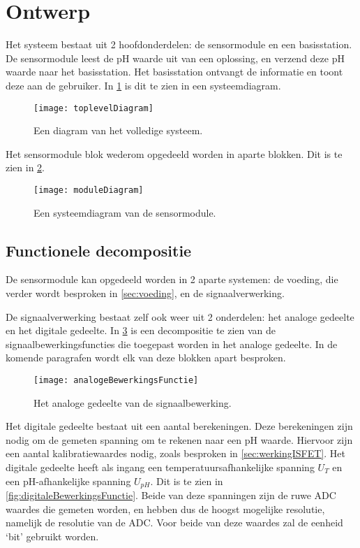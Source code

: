 \section{Ontwerp}\label{sec:ontwerp}
Het systeem bestaat uit 2 hoofdonderdelen: de sensormodule en een basisstation. De sensormodule leest de pH waarde uit van een oplossing, en verzend deze pH waarde naar het basisstation. Het basisstation ontvangt de informatie en toont deze aan de gebruiker.
In \cref{fig:functional} is dit te zien in een systeemdiagram.

\begin{figure}[ht]
    \centering
    \texttt{[image: toplevelDiagram]}
    \caption[short]{Een diagram van het volledige systeem.}
    \label{fig:functional}
\end{figure}

Het sensormodule blok wederom opgedeeld worden in aparte blokken. Dit is te zien in \cref{fig:moduleDiagram}.

\begin{figure}[ht]
    \centering
    \texttt{[image: moduleDiagram]}
    \caption{Een systeemdiagram van de sensormodule.} 
    \label{fig:moduleDiagram}
\end{figure}

\subsection{Functionele decompositie}
De sensormodule kan opgedeeld worden in 2 aparte systemen: de voeding, die verder wordt besproken in \cref{sec:voeding}, en de signaalverwerking.

De signaalverwerking bestaat zelf ook weer uit 2 onderdelen: het analoge gedeelte en het digitale gedeelte. In \cref{fig:analogeBewerkingsFunctie} is een decompositie te zien van de signaalbewerkingsfuncties die toegepast worden in het analoge gedeelte. In de komende paragrafen wordt elk van deze blokken apart besproken.

\begin{figure}[ht]
    \centering
    \texttt{[image: analogeBewerkingsFunctie]}
    \caption{Het analoge gedeelte van de signaalbewerking.} 
    \label{fig:analogeBewerkingsFunctie}
\end{figure}


Het digitale gedeelte bestaat uit een aantal berekeningen. Deze berekeningen zijn nodig om de gemeten spanning om te rekenen naar een pH waarde. Hiervoor zijn een aantal kalibratiewaardes nodig, zoals besproken in \cref{sec:werkingISFET}. Het digitale gedeelte heeft als ingang een temperatuursafhankelijke spanning $U_T$ en een pH-afhankelijke spanning $U_{pH}$. Dit is te zien in \cref{fig:digitaleBewerkingsFunctie}. Beide van deze spanningen zijn de ruwe ADC waardes die gemeten worden, en hebben dus de hoogst mogelijke resolutie, namelijk de resolutie van de ADC. Voor beide van deze waardes zal de eenheid `bit' gebruikt worden.

